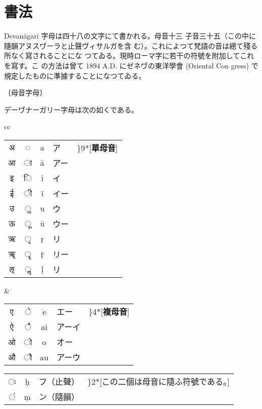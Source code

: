 \chapter{書法}
\numberParagraph
Devanāgarī 字母は四十八の文字にて書かれる。母音十三
子音三十五（この中に隨韻アヌスヷーラと止聲ヴィサルガを含
む）。これによつて梵語の音は總て殘る所なく寫されることにな
つてゐる。現時ローマ字に若干の符號を附加してこれを寫す。こ
の方法は曾て 1894 A.D. にゼネヷの東洋學會 (Oriental Con\-%
gress) で規定したものに準據することになつてゐる。

\begin{center}
〔母音字母〕
\end{center}

\numberParagraph \label{np:6}
デーヷナーガリー字母は次の如くである。

\begin{tabular}{cc}
  \begin{minipage}{0.46\hsize}
  \begin{tabular}{cccll}
  {\dnf अ} & {\dnf ◌} & a & ア & \rdelim\}{9}{*}[\textbf{單母音}] \\
  {\dnf आ} & {\dnf ा} & ā & アー & \\
  {\dnf इ} & {\dnf ि} & i & イ & \\
  {\dnf ई} & {\dnf ी} & ī & イー& \\
  {\dnf उ} & {\dnf ु} & u & ウ & \\
  {\dnf ऊ} & {\dnf ू} & ū & ウー & \\
  {\dnf ऋ} & {\dnf ृ} & ṛ & リ & \\
  {\dnf ॠ} & {\dnf ॄ} & ṝ & リー & \\
  {\dnf ऌ} & {\dnf ॢ} & ḷ & リ &
  \end{tabular}
  \end{minipage}
  &
  \begin{minipage}{0.46\hsize}
  \begin{tabular}{cccll}
  {\dnf ए} & {\dnf े} & e & エー & \rdelim\}{4}{*}[\textbf{複母音}] \\
  {\dnf ऐ} & {\dnf ै} & ai & アーイ & \\
  {\dnf ओ} & {\dnf ो} & o & オー & \\
  {\dnf औ} & {\dnf ौ} & au & アーウ &
  \end{tabular}
  \vspace{1\zh}

  \renewcommand{\arraystretch}{1.5}
  \begin{tabular}{ccll}
  {\dnf ः} & ḥ & フ（止聲）& \rdelim\}{2}{*}[\parbox{6\zw}{この二個は母音に隨ふ符號である。}] \\
  {\dnf ं} & ṃ & ン（隨韻）&
  \end{tabular}
  \renewcommand{\arraystretch}{1}
  \end{minipage}
\end{tabular}


